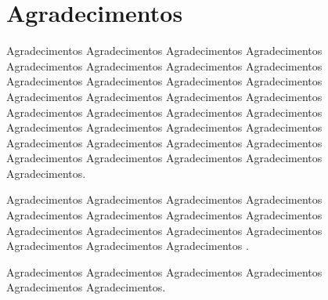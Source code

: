 \section*{Agradecimentos}


Agradecimentos Agradecimentos Agradecimentos  Agradecimentos
Agradecimentos Agradecimentos Agradecimentos Agradecimentos
Agradecimentos Agradecimentos Agradecimentos Agradecimentos
Agradecimentos Agradecimentos Agradecimentos Agradecimentos
Agradecimentos Agradecimentos Agradecimentos Agradecimentos
Agradecimentos Agradecimentos Agradecimentos Agradecimentos
Agradecimentos Agradecimentos Agradecimentos Agradecimentos
Agradecimentos Agradecimentos Agradecimentos Agradecimentos
Agradecimentos.

Agradecimentos Agradecimentos Agradecimentos Agradecimentos
Agradecimentos Agradecimentos Agradecimentos Agradecimentos
Agradecimentos Agradecimentos Agradecimentos Agradecimentos
Agradecimentos Agradecimentos Agradecimentos .

Agradecimentos Agradecimentos Agradecimentos Agradecimentos
Agradecimentos Agradecimentos.
